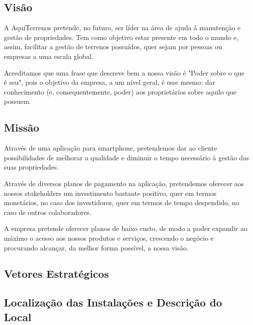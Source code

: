 \documentclass[11pt]{article}
\begin{document}
	\vspace{1cm}
	
	\large
	\subsection{Visão}
	
	\normalsize
	
	A AquiTerrenos pretende, no futuro, ser líder na área de ajuda à manutenção e gestão de propriedades. Tem como objetivo estar presente em todo o mundo e, assim, facilitar a gestão de terrenos possuídos, quer sejam por pessoas ou empresas a uma escala global.
	
	Acreditamos que uma frase que descreve bem a nossa visão é "Poder sobre o que é seu", pois o objetivo da empresa, a um nível geral, é esse mesmo: dar conhecimento (e, consequentemente, poder) aos proprietários sobre aquilo que possuem.
	
	\large
	\subsection{Missão}
	
	\normalsize
	
	Através de uma aplicação para smartphone, pretendemos dar ao cliente possibilidades de melhorar a qualidade e diminuir o tempo necessário à gestão das suas propriedades.
	
	Através de diversos planos de pagamento na aplicação, pretendemos oferecer aos nossos stakeholders um investimento bastante positivo, quer em termos monetários, no caso dos investidores, quer em termos de tempo despendido, no caso de outros colaboradores.
	
	A empresa pretende oferecer planos de baixo custo, de modo a poder expandir ao máximo o acesso aos nossos produtos e serviços, crescendo o negócio e procurando alcançar, da melhor forma possível, a nossa visão.
	
	\large
	\subsection{Vetores Estratégicos}
	
	\normalsize
	
	
	\large
	\subsection{Localização das Instalações e Descrição do Local}
	
	\normalsize
	
\end{document}
